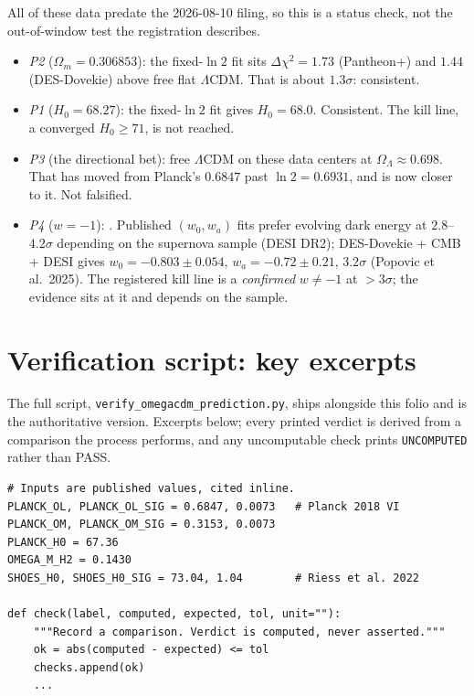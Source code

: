\documentclass{alienfolio}
\begin{document}
All of these data predate the 2026-08-10 filing, so this
is a status check, not the out-of-window test the registration
describes.
\begin{itemize}
\item \emph{P2} ($\Omega_{m} = 0.306853$): the fixed-$\ln 2$ fit sits
$\Delta\chi^{2} = 1.73$ (Pantheon+) and $1.44$ (DES-Dovekie) above
free flat $\Lambda$CDM. That is about $1.3\sigma$: consistent.
\item \emph{P1} ($H_{0} = 68.27$): the fixed-$\ln 2$ fit gives
$H_{0} = 68.0$. Consistent. The kill line, a converged
$H_{0} \ge 71$, is not reached.
\item \emph{P3} (the directional bet): free $\Lambda$CDM on these
data centers at $\Omega_{\Lambda} \approx 0.698$. That has moved
from Planck's $0.6847$ past $\ln 2 = 0.6931$, and is now closer to
it. Not falsified.
\item \emph{P4} ($w = -1$): . Published
$(w_{0}, w_{a})$ fits prefer evolving dark energy at
$2.8$--$4.2\sigma$ depending on the supernova sample (DESI DR2);
DES-Dovekie + CMB + DESI gives $w_{0} = -0.803 \pm 0.054$,
$w_{a} = -0.72 \pm 0.21$, $3.2\sigma$ (Popovic et al.\ 2025). The
registered kill line is a \emph{confirmed} $w \ne -1$ at $> 3\sigma$;
the evidence sits at it and depends on the sample.
\end{itemize}

\goldrule

\appendix

\section{Verification script: key excerpts}
\label{app:script}

The full script, \texttt{verify\_omegacdm\_prediction.py}, ships
alongside this folio and is the authoritative version. Excerpts
below; every printed verdict is derived from a comparison the
process performs, and any uncomputable check prints
\texttt{UNCOMPUTED} rather than PASS.

\begin{lstlisting}
# Inputs are published values, cited inline.
PLANCK_OL, PLANCK_OL_SIG = 0.6847, 0.0073   # Planck 2018 VI
PLANCK_OM, PLANCK_OM_SIG = 0.3153, 0.0073
PLANCK_H0 = 67.36
OMEGA_M_H2 = 0.1430
SHOES_H0, SHOES_H0_SIG = 73.04, 1.04        # Riess et al. 2022

def check(label, computed, expected, tol, unit=""):
    """Record a comparison. Verdict is computed, never asserted."""
    ok = abs(computed - expected) <= tol
    checks.append(ok)
    ...
\end{lstlisting}
\end{document}
